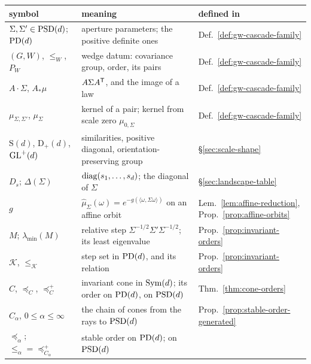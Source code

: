 \begin{table}[ht]
\centering
\small
\setlength{\tabcolsep}{4pt}
\renewcommand{\arraystretch}{1.1}
\begin{tabular}{@{}p{}p{}p{}@{}}
\toprule
symbol & meaning & defined in \\
\midrule
$\Sigma, \Sigma' \in \mathrm{PSD}(d)$; $\mathrm{PD}(d)$ & aperture parameters; the positive definite ones &
Def.~\ref{def:gw-cascade-family} \\
$(G, W)$, $\le_W$, $P_W$ & wedge datum: covariance group, order, its pairs & Def.~\ref{def:gw-cascade-family} \\
$A \cdot \Sigma$, $A_*\mu$ & $A\Sigma A^{\mathsf{T}}$, and the image of a law & Def.~\ref{def:gw-cascade-family} \\
$\mu_{\Sigma,\Sigma'}$, $\mu_\Sigma$ & kernel of a pair; kernel from scale zero $\mu_{0,\Sigma}$ &
Def.~\ref{def:gw-cascade-family} \\
$\mathrm S(d)$, $\mathrm D_+(d)$, $\mathrm{GL}^+(d)$ & similarities, positive diagonal, orientation-preserving
group & \S\ref{sec:scale-shape} \\
$D_s$; $\Delta(\Sigma)$ & $\operatorname{diag}(s_1,\dots,s_d)$; the diagonal of $\Sigma$ & \S\ref{sec:landscape-table} \\
$g$ & $\widehat\mu_\Sigma(\omega) = e^{-g(\langle\omega,\Sigma\omega\rangle)}$ on an affine orbit &
Lem.~\ref{lem:affine-reduction}, Prop.~\ref{prop:affine-orbits} \\
$M$; $\lambda_{\min}(M)$ & relative step $\Sigma^{-1/2}\Sigma'\Sigma^{-1/2}$; its least
eigenvalue & Prop.~\ref{prop:invariant-orders} \\
$\mathcal K$, $\le_{\mathcal K}$ & step set in $\mathrm{PD}(d)$, and its relation &
Prop.~\ref{prop:invariant-orders} \\
$C$, $\preceq_C$, $\preceq^+_C$ & invariant cone in $\mathrm{Sym}(d)$; its order on $\mathrm{PD}(d)$, on $\mathrm{PSD}(d)$ &
Thm.~\ref{thm:cone-orders} \\
$C_\alpha$, $0 \le \alpha \le \infty$ & the chain of cones from the rays to $\mathrm{PSD}(d)$ &
Prop.~\ref{prop:stable-order-generated} \\
$\preceq_\alpha$; $\le_\alpha = \preceq^+_{C_\alpha}$ & stable order on $\mathrm{PD}(d)$; on $\mathrm{PSD}(d)$ &

\end{tabular}
\end{table}
